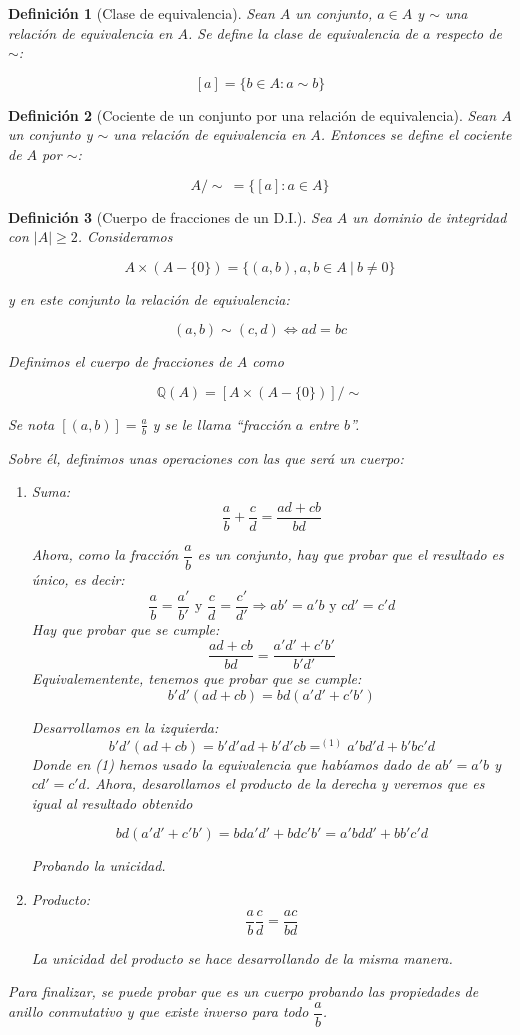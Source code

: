 \documentclass[11pt, a4paper, titlepage]{article}
\newif\IfInSansMode
\theoremstyle{theorem-style}
\theoremstyle{definition-style}
\newtheorem{ndef}{Definición}[section]
\theoremstyle{remark-style}
\theoremstyle{example-style}
\newenvironment{nlist}
{\begin{enumerate}
\renewcommand\labelenumi{(\emph{\roman{enumi})}}}
{\end{enumerate}}
\begin{document}
\begin{ndef}[Clase de equivalencia]
  Sean $A$ un conjunto, $a\in A$ y $\sim$ una relación de equivalencia en $A$. Se define la clase de equivalencia
  de $a$ respecto de $\sim$:

  \[
     [a] = \{ b \in A : a \sim b \}
  \]
\end{ndef}

\begin{ndef}[Cociente de un conjunto por una relación de equivalencia]
  Sean $A$ un conjunto y $\sim$ una relación de equivalencia en $A$. Entonces se define el cociente de $A$ por $\sim$:

  \[
     A/\sim \ = \{ [a] : a \in A\}
  \]
\end{ndef}

\begin{ndef}[Cuerpo de fracciones de un D.I.]
  Sea $A$ un dominio de integridad con $|A| \geq 2$. Consideramos

  $$A\times (A-\{0\}) = \{(a,b), a,b \in A\ |\ b\neq 0\}$$

  y en este conjunto la relación de equivalencia:

  \[
     (a,b) \sim (c,d) \iff ad = bc
  \]

  Definimos el cuerpo de fracciones de $A$ como

  $$\mathbb{Q}(A) = [A\times (A-\{0\})]/\sim$$

    Se nota $[(a,b)] = \displaystyle\frac{a}{b}$ y se le llama ``fracción $a$ entre $b$''.

  Sobre él, definimos unas operaciones con las que será un cuerpo:
\begin{nlist}
	\item Suma: \[\frac{a}{b}+ \frac{c}{d} = \frac{ad + cb}{bd}\]

Ahora, como la fracción $\dfrac{a}{b}$ es un conjunto, hay que probar que el resultado es único, es decir:
\[
\frac{a}{b}= \frac{a'}{b'} \text{ y } \frac{c}{d}= \frac{c'}{d'}  \Rightarrow ab' = a'b \text{ y } cd' = c'd
\]
Hay que probar que se cumple:
\[
\frac{ad+cb}{bd} = \frac{a'd'+c'b'}{b'd'}
\]
Equivalementente, tenemos que probar que se cumple:
\[
b'd'(ad+cb) = bd(a'd'+c'b')
\]

Desarrollamos en la izquierda:
\[
b'd'(ad+cb) = b'd'ad + b'd'cb =^{(1)} a'bd'd + b'bc'd
\]
Donde en (1) hemos usado la equivalencia que habíamos dado de $ab' = a'b$ y $cd' = c'd$. Ahora, desarollamos el producto de la derecha y veremos que es igual al resultado obtenido

\[
bd(a'd'+c'b') = bda'd' + bdc'b' = a'bdd' + bb'c'd
\]

Probando la unicidad.

    \item Producto: \[\frac{a}{b} \frac{c}{d} = \frac{ac}{bd}\]

La unicidad del producto se hace desarrollando de la misma manera.
\end{nlist}



Para finalizar, se puede probar que es un cuerpo probando las propiedades de anillo conmutativo y que existe inverso para todo $\dfrac{a}{b}$.
\end{ndef}
\end{document}
